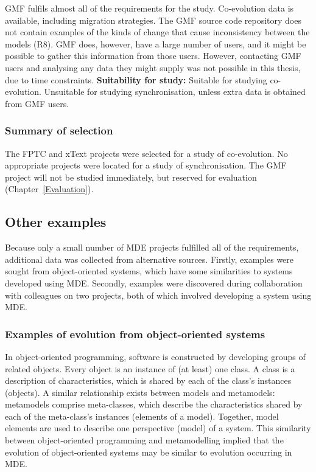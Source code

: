 GMF fulfils almost all of the requirements for the study. Co-evolution data is available, including migration strategies. The GMF source code repository does not contain examples of the kinds of change that cause inconsistency between the models (R8). GMF does, however, have a large number of users, and it might be possible to gather this information from those users. However, contacting GMF users and analysing any data they might supply was not possible in this thesis, due to time constraints.  \textbf{Suitability for study:} Suitable for studying co-evolution. Unsuitable for studying synchronisation, unless extra data is obtained from GMF users.

\subsubsection{Summary of selection}
The FPTC and xText projects were selected for a study of co-evolution. No appropriate projects were located for a study of synchronisation. The GMF project will not be studied immediately, but reserved for evaluation (Chapter~\ref{Evaluation}).


\subsection{Other examples}
Because only a small number of MDE projects fulfilled all of the requirements, additional data was collected from alternative sources. Firstly, examples were sought from object-oriented systems, which have some similarities to systems developed using MDE. Secondly, examples were discovered during collaboration with colleagues on two projects, both of which involved developing a system using MDE.

\subsubsection{Examples of evolution from object-oriented systems}
In object-oriented programming, software is constructed by developing groups of related objects. Every object is an instance of (at least) one class. A class is a description of characteristics, which is shared by each of the class's instances (objects). A similar relationship exists between models and metamodels: metamodels comprise meta-classes, which describe the characteristics shared by each of the meta-class's instances (elements of a model). Together, model elements are used to describe one perspective (model) of a system. This similarity between object-oriented programming and metamodelling implied that the evolution of object-oriented systems may be similar to evolution occurring in MDE. 

